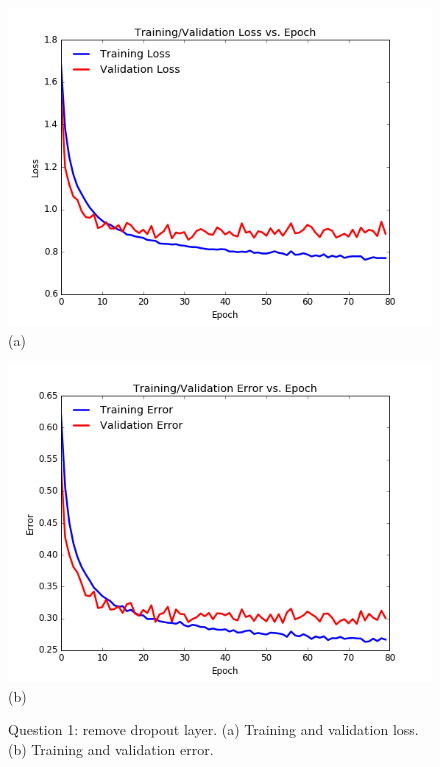 \documentclass[paper=a4, fontsize=11pt]{scrartcl}
\begin{document}
\begin{figure}
\centering
\centering
 \begin{minipage}{.5\columnwidth}
\centering
  	\includegraphics[width=1\linewidth]{question1_loss.png}
  	\footnotesize{(a)}
 \end{minipage}\hfill%
\centering
 \begin{minipage}{.5\columnwidth}
\centering
  	\includegraphics[width=1\columnwidth]{question1_error.png}
  	\footnotesize{(b)}
 \end{minipage}\hfill%
\caption{Question 1: remove dropout layer. (a) Training and validation loss. (b) Training and validation error.}
\label{fig:question1}
\end{figure}
\end{document}
